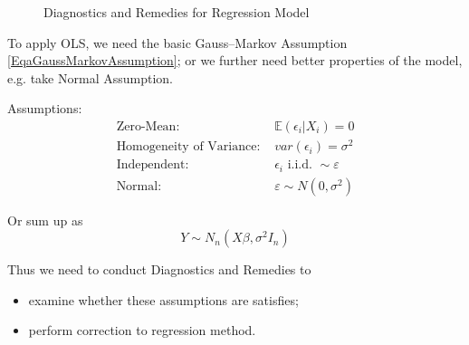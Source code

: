 \begin{figure}[htbp]
\begin{center}
    \caption{Diagnostics and Remedies for Regression Model}
    
\end{center}
\end{figure}






    To apply OLS, we need the basic Gauss–Markov Assumption \autoref{EqaGaussMarkovAssumption}; or we further need better properties of the model, e.g. take Normal Assumption.
    
    Assumptions:
    \begin{equation}
        \begin{aligned}
            \text{Zero-Mean: }&\mathbb{E}(\epsilon_i|X_i)=0 \\
            \text{Homogeneity of Variance: }&var(\epsilon_i)=\sigma^2\\
            \text{Independent: }&\epsilon_i\text{ i.i.d. }\sim \varepsilon\\
            \text{Normal: }&\varepsilon \sim N(0,\sigma^2)
        \end{aligned}
    \end{equation}
    
    Or sum up as 
    \begin{equation}
        Y\sim N_n(X\beta ,\sigma^2I_n) 
    \end{equation}
    
    
    
    Thus we need to conduct Diagnostics and Remedies to 
    \begin{itemize}[topsep=2pt,itemsep=2pt]
        \item examine whether these assumptions are satisfies;
        \item perform correction to regression method.
    \end{itemize}

